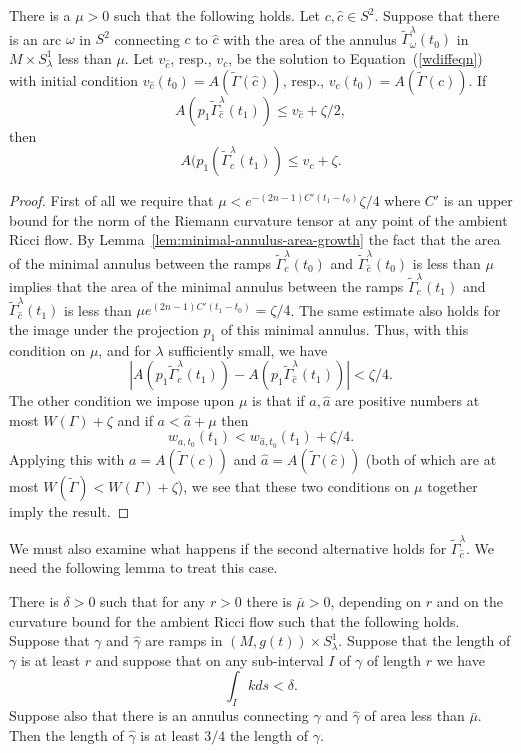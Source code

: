 \begin{lemma}
\label{lem:mu-net-area-comparison}
\label{muarea}
There is a $\mu>0$ such that the following holds. Let $c,\hat c\in
S^2$. Suppose that there is an arc $\omega$ in $S^2$ connecting $c$
to $\hat c$ with the area of the annulus
$\widetilde\Gamma_\omega^\lambda(t_0)$ in $M\times S^1_\lambda$ less
than $\mu$. Let $v_{\hat c}$, resp., $v_c$, be the solution to
Equation~(\ref{wdiffeqn}) with initial condition $v_{\hat
c}(t_0)=A(\widetilde\Gamma(\hat c))$, resp.,
$v_c(t_0)=A(\widetilde\Gamma(c))$. If
 $$A(p_1\widetilde\Gamma^\lambda_{\hat c}(t_1))\le v_{\hat c}+\zeta/2,$$
then
$$A(p_1(\widetilde\Gamma^\lambda_c(t_1))\le v_c+\zeta.$$
\end{lemma}


\begin{proof}
 First of all we require that $\mu<e^{-(2n-1)C'(t_1-t_0)}\zeta/4$
where $C'$ is an upper bound for the norm of the Riemann curvature
tensor at any point of the ambient Ricci flow.  By
Lemma~\ref{lem:minimal-annulus-area-growth} the fact that the area of the minimal annulus
between the ramps $\widetilde\Gamma_c^\lambda(t_0)$ and
$\widetilde\Gamma_{\hat c}^\lambda(t_0)$ is less than $\mu$ implies
that the area of the minimal annulus between the ramps
$\widetilde\Gamma_c^\lambda(t_1)$ and $\widetilde\Gamma_{\hat
c}^\lambda(t_1)$ is less than $\mu e^{(2n-1)C'(t_1-t_0)}=\zeta/4$.
The same estimate also holds for the image under the projection
$p_1$ of this minimal annulus. Thus, with this condition on $\mu$,
and for $\lambda$ sufficiently small, we have
$$\left|A(p_1\widetilde\Gamma_c^\lambda(t_1))-A(p_1\widetilde\Gamma_{\hat c}^\lambda(t_1))\right|<\zeta/4.$$
The other condition we impose upon $\mu$ is that if $a,\hat a$ are
positive numbers at most $W(\Gamma)+\zeta$ and if $a<\hat a+\mu$
then
$$w_{a,t_0}(t_1)<w_{\hat a,t_0}(t_1)+\zeta/4.$$
Applying this with $a=A(\widetilde\Gamma(c))$ and $\hat
a=A(\widetilde\Gamma(\hat c))$ (both of which are at most
$W(\widetilde \Gamma)<W(\Gamma)+\zeta$), we see that these two
conditions on $\mu$ together imply the result.
\end{proof}

 We must also examine what
happens if the second alternative holds for $\widetilde\Gamma_{\hat
c}^\lambda$. We need the following lemma to treat this case.

\begin{lemma}
\label{lem:ramp-length-comparison-small-annulus}
\label{BARMU}
There is  $\delta>0$ such that for any $r>0$  there is $\bar\mu>0$,
depending on $r$ and on the curvature bound for the ambient Ricci
flow such that the following holds. Suppose that $\gamma$ and $\hat
\gamma$ are ramps in $(M,g(t))\times S^1_\lambda$. Suppose that the
length of $\gamma$ is at least $r$ and suppose that on any
sub-interval $I$ of $\gamma$ of length $r$ we have
$$\int_Ikds<\delta.$$
 Suppose also that there is an annulus connecting $\gamma$ and
$\hat\gamma$ of area less than $\bar\mu$. Then the length of
$\hat\gamma$ is at least $3/4$ the length of $\gamma$.
\end{lemma}

